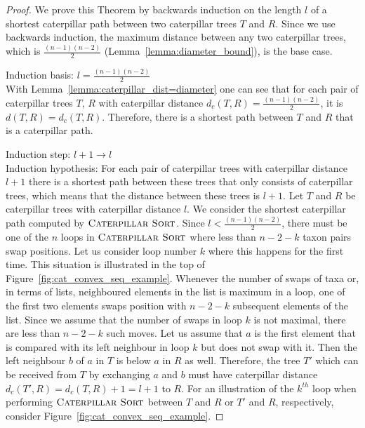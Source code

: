 \documentclass{amsart}
\newcommand{\csort}{\textsc{Caterpillar Sort}}
\begin{document}
\begin{proof}
    We prove this Theorem by backwards induction on the length $l$ of a shortest caterpillar path between two caterpillar trees $T$ and $R$.
    Since we use backwards induction, the maximum distance between any two caterpillar trees, which is $\frac{(n-1)(n-2)}{2}$ (Lemma~\ref{lemma:diameter_bound}), is the base case.

    Induction basis: $l = \frac{(n-1)(n-2)}{2}$\\
    With Lemma~\ref{lemma:caterpillar_dist=diameter} one can see that for each pair of caterpillar trees $T$, $R$ with caterpillar distance $d_c(T,R) = \frac{(n-1)(n-2)}{2}$, it is $d(T,R) = d_c(T,R)$.
    Therefore, there is a shortest path between $T$ and $R$ that is a caterpillar path.

    Induction step: $l+1 \to l$\\
    Induction hypothesis: For each pair of caterpillar trees with caterpillar distance $l+1$ there is a shortest path between these trees that only consists of caterpillar trees, which means that the distance between these trees is $l+1$.
    Let $T$ and $R$ be caterpillar trees with caterpillar distance $l$.
    We consider the shortest caterpillar path computed by $\csort$.
    Since $l < \frac{(n-1)(n-2)}{2}$, there must be one of the $n$ loops in $\csort$ where less than $n-2-k$ taxon pairs swap positions.
    Let us consider loop number $k$ where this happens for the first time.
    This situation is illustrated in the top of Figure~\ref{fig:cat_convex_seq_example}.
    Whenever the number of swaps of taxa or, in terms of lists, neighboured elements in the list is maximum in a loop, one of the first two elements swaps position with $n-2-k$ subsequent elements of the list.
    Since we assume that the number of swaps in loop $k$ is not maximal, there are less than $n-2-k$ such moves.
    Let us assume that $a$ is the first element that is compared with its left neighbour in loop $k$ but does not swap with it.
    Then the left neighbour $b$ of $a$ in $T$ is below $a$ in $R$ as well.
    Therefore, the tree $T'$ which can be received from $T$ by exchanging $a$ and $b$ must have caterpillar distance $d_c(T',R) = d_c(T,R) + 1 = l + 1$ to $R$.
    For an illustration of the $k^{th}$ loop when performing $\csort$ between $T$ and $R$ or $T'$ and $R$, respectively, consider Figure~\ref{fig:cat_convex_seq_example}.


\end{proof}
\end{document}
